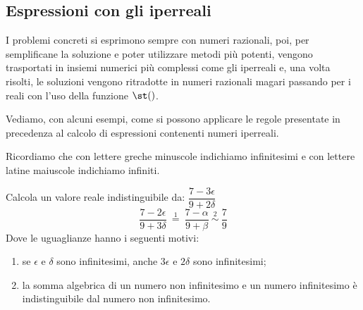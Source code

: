 \subsection{Espressioni con gli iperreali}
\label{subsec:insnum_espressioni}

I problemi concreti si esprimono sempre con numeri razionali, poi, per 
semplificane la soluzione e poter utilizzare metodi più potenti, vengono 
trasportati in insiemi numerici più complessi come gli iperreali e, una volta 
risolti, le soluzioni vengono ritradotte in numeri razionali magari passando 
per i reali con l'uso della funzione \(\st()\).


Vediamo, con alcuni esempi, come si possono applicare 
le regole presentate in precedenza al calcolo di espressioni 
contenenti numeri iperreali. 

Ricordiamo che con lettere greche minuscole indichiamo infinitesimi e con 
lettere latine maiuscole indichiamo infiniti.


\begin{esempio}
Calcola un valore reale indistinguibile da: \quad
\(\dfrac{7 -3 \epsilon}{9 +2 \delta}\)
\[\dfrac{7 -2 \epsilon}{9 +3 \delta} 
~ \stackrel{1}{=} ~
  \dfrac{7 -\alpha}{9 +\beta}
~ \stackrel{2}{\sim} ~ \dfrac{7}{9}\]
Dove le uguaglianze hanno i seguenti motivi:
\begin{enumerate} [nosep] 
 \item se \(\epsilon \text{ e } \delta\) sono infinitesimi, 
 anche \(3\epsilon\) e \(2 \delta\) sono infinitesimi;
 \item la somma algebrica di un numero non infinitesimo e un numero 
infinitesimo è indistinguibile dal numero non infinitesimo.
\end{enumerate}
\end{esempio}

